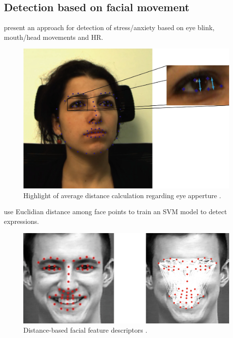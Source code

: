 \subsection{Detection based on facial movement}

\textcite{giannakakis2017stress} present an approach for detection of stress/anxiety based on eye blink, mouth/head movements and HR.

\begin{figure}[h]
    \centering
    \includegraphics[width=\linewidth]{figures/giannakakis2017stress-eye.png}
    \caption{Highlight of average distance calculation regarding eye apperture \parencite{giannakakis2017stress}.}
    \label{fig:distance-samara}
\end{figure}

\textcite{samara2016sensing} use Euclidian distance among face points to train an SVM model to detect expressions.

\begin{figure}[h]
    \centering
    \includegraphics[width=\linewidth]{figures/samara2016sensing-distances.png}
    \caption{Distance-based facial feature descriptors \parencite{samara2016sensing}.}
    \label{fig:distance-samara}
\end{figure}
